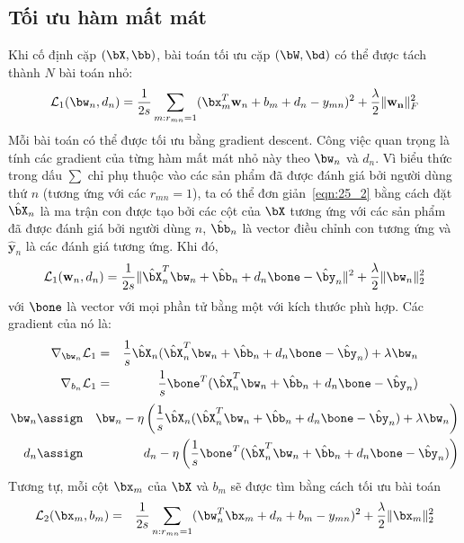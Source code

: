 \subsection{Tối ưu hàm mất mát }
Khi cố định cặp $(\bX, \bb)$, bài toán tối ưu cặp $(\bW, \bd)$ có thể được tách
thành $N$ bài toán nhỏ:
\begin{equation} 
\label{eqn:25_2}
\mathcal{L}_1(\bw_n, d_n) = \frac{1}{2s} \sum_{m:r_{mn} = 1}
(\bx_m^T\mathbf{w}_n + b_m + d_n - y_{mn})^2 + \frac{\lambda}{2}
\|\mathbf{w_n}\|_F^2
\end{equation} 
Mỗi bài toán có thể được tối ưu bằng gradient descent. Công việc quan trọng là tính các gradient của từng hàm mất mát nhỏ này theo $\bw_n$ và
$d_n$.
 Vì biểu thức trong dấu $\sum$ chỉ phụ thuộc vào các sản phẩm đã được đánh
giá bởi người dùng thứ $n$ (tương ứng với các $r_{mn}  = 1$), ta có thể đơn
giản~\eqref{eqn:25_2} bằng cách đặt $\hat{\bX}_n$ là ma trận con được tạo bởi
các cột của $\bX$ tương ứng với các sản phẩm đã được đánh giá bởi
người dùng $n$, $\hat{\bb}_n$ là vector điều chỉnh con tương ứng và
$\hat{\mathbf{y}}_n$ là các đánh giá tương ứng. Khi đó,
\begin{equation} 
\mathcal{L}_1(\mathbf{w}_n, d_n) = \frac{1}{2s} \|\hat{\bX}^T_n\bw_n +
\hat{\bb}_n
+ d_n\bone - \hat{\by}_n\|^2 + \frac{\lambda}{2}\|\bw_n\|_2^2
\end{equation} 
với $\bone$ là vector với mọi phần tử bằng một với kích thước phù hợp. Các gradient 
của nó là:
\begin{eqnarray} 
\nabla_{\bw_n}\mathcal{L}_1
&=&
\frac{1}{s}\hat{\bX}_n(\hat{\bX}_n^T\bw_n + \hat{\bb}_n + d_n\bone -
\hat{\by}_n) + \lambda \bw_n \\\
\nabla_{b_n}\mathcal{L}_1
&=&
\frac{1}{s}\bone^T(\hat{\bX}_n^T\bw_n + \hat{\bb}_n + d_n\bone -
\hat{\by}_n)
\end{eqnarray} 
\begin{eqnarray} 
\bw_n &\assign& \bw_n - \eta \left(\frac{1}{s}\hat{\bX}_n(\hat{\bX}_n^T\bw_n +
\hat{\bb}_n + d_n\bone - \hat{\by}_n) + \lambda \bw_n\right) \\
d_n &\assign& d_n - \eta \left(\frac{1}{s}\bone^T(\hat{\bX}_n^T\bw_n + \hat{\bb}_n + d_n\bone -
\hat{\by}_n)\right)
\end{eqnarray} 
Tương tự, mỗi cột $\bx_m$ của $\bX$ và $b_m$ sẽ được tìm bằng cách tối ưu bài toán 
\begin{eqnarray} 
\label{eqn:25_xm}
\mathcal{L}_2(\bx_m, b_m) &=& \frac{1}{2s}\sum_{n:r_{mn} = 1}
(\bw_n^T\bx_m + d_n  + b_m - y_{mn})^2 + \frac{\lambda}{2}\|\bx_m\|_2^2
\end{eqnarray}
